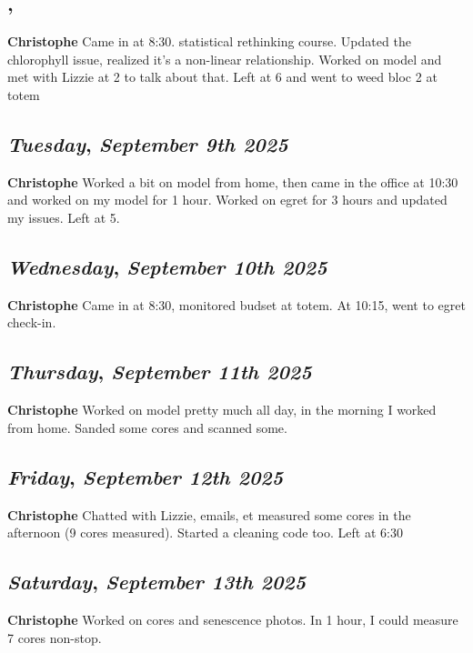 \subsection*{\weekday, \day}
\textbf {Christophe}
Came in at 8:30. statistical rethinking course. Updated the chlorophyll issue, realized it's a non-linear relationship. Worked on model and met with Lizzie at 2 to talk about that. Left at 6 and went to weed bloc 2 at totem

\def\day{\textit{September 9th 2025}}
\def\weekday{\textit{Tuesday}}
\subsection*{\weekday, \day}
\textbf {Christophe}
Worked a bit on model from home, then came in the office at 10:30 and worked on my model for 1 hour. Worked on egret for 3 hours and updated my issues. Left at 5.

\def\day{\textit{September 10th 2025}}
\def\weekday{\textit{Wednesday}}
\subsection*{\weekday, \day}
\textbf {Christophe}
Came in at 8:30, monitored budset at totem. At 10:15, went to egret check-in. 

\def\day{\textit{September 11th 2025}}
\def\weekday{\textit{Thursday}}
\subsection*{\weekday, \day}
\textbf {Christophe}
Worked on model pretty much all day, in the morning I worked from home. Sanded some cores and scanned some. 

\def\day{\textit{September 12th 2025}}
\def\weekday{\textit{Friday}}
\subsection*{\weekday, \day}
\textbf {Christophe}
Chatted with Lizzie, emails, et measured some cores in the afternoon (9 cores measured). Started a cleaning code too. Left at 6:30

\def\day{\textit{September 13th 2025}}
\def\weekday{\textit{Saturday}}
\subsection*{\weekday, \day}
\textbf {Christophe}
Worked on cores and senescence photos. In 1 hour, I could measure 7 cores non-stop.

